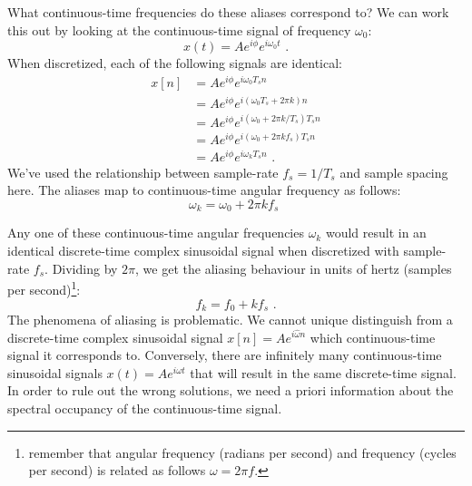 What continuous-time frequencies do these aliases correspond to? We
can work this out by looking at the continuous-time signal of
frequency $\omega_0$:
\begin{equation}
  x(t) = A e^{i\phi} e^{i\omega_0 t}\,\,.
\end{equation}
When discretized, each of the following signals are identical:
\begin{align}
  x[n] &=A e^{i\phi} e^{i \omega_0 T_s n }\\
 &= A e^{i\phi} e^{i(\omega_0 T_s + 2\pi k) n }\\
  &= A e^{i\phi} e^{i(\omega_0 + 2\pi k/T_s) T_s n }  \\
    &= A e^{i\phi} e^{i(\omega_0 + 2\pi k f_s) T_s n }  \\
    &= A e^{i\phi} e^{i \omega_k T_s n } \,\,.
\end{align}
We've used the relationship between sample-rate $f_s=1/T_s$ and sample
spacing here. The aliases map to continuous-time angular frequency as
follows:
\begin{equation}
  \boxed{
    \omega_k = \omega_0 + 2\pi k f_s
    }\,\,
\end{equation}



Any one of these continuous-time angular frequencies $\omega_k$ would
result in an identical discrete-time complex sinusoidal signal when
discretized with sample-rate $f_s$. Dividing by
$2\pi$, we get the aliasing behaviour in units of hertz (samples per
second)\footnote{remember that angular frequency (radians per second)
  and frequency (cycles per second) is related as follows $\omega = 2\pi
  f$.}:
\begin{equation}
  \boxed{
    f_k = f_0 + k f_s
    }\,\,.
\end{equation}
The phenomena of aliasing is problematic. We cannot unique distinguish
from a discrete-time complex sinusoidal signal $x[n]=Ae^{i\hat{\omega}
  n}$ which continuous-time signal it corresponds to. Conversely,
there are infinitely many continuous-time sinusoidal signals
$x(t)=Ae^{i\omega t}$ that will result in the same discrete-time
signal. In order to rule out the wrong solutions, we need a priori
information about the spectral occupancy of the continuous-time
signal.

